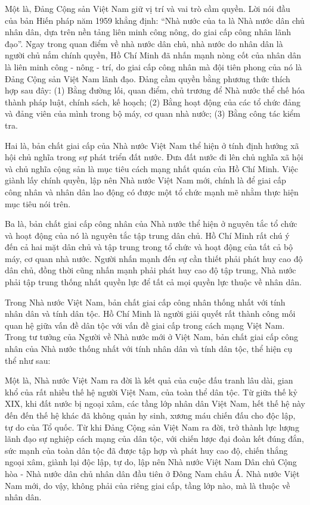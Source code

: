 Một là, Đảng Cộng sản Việt Nam giữ vị trí và vai trò cầm quyền. Lời nói đầu của bản Hiến pháp năm 1959 khẳng định: “Nhà nước của ta là Nhà nước dân chủ nhân dân, dựa trên nền tảng liên minh công nông, do giai cấp công nhân lãnh đạo”. Ngay trong quan điểm về nhà nước dân chủ, nhà nước do nhân dân là người chủ nắm chính quyền, Hồ Chí Minh đã nhấn mạnh nòng cốt của nhân dân là liên minh công - nông - trí, do giai cấp công nhân mà đội tiên phong của nó là Đảng Cộng sản Việt Nam lãnh đạo. Đảng cầm quyền bằng phương thức thích hợp sau đây: (1) Bằng đường lối, quan điểm, chủ trương để Nhà nước thể chế hóa thành pháp luật, chính sách, kế hoạch; (2) Bằng hoạt động của các tổ chức đảng và đảng viên của mình trong bộ máy, cơ quan nhà nước; (3) Bằng công tác kiểm tra.

Hai là, bản chất giai cấp của Nhà nước Việt Nam thể hiện ở tính định hướng xã hội chủ nghĩa trong sự phát triển đất nước. Đưa đất nước đi lên chủ nghĩa xã hội và chủ nghĩa cộng sản là mục tiêu cách mạng nhất quán của Hồ Chí Minh. Việc giành lấy chính quyền, lập nên Nhà nước Việt Nam mới, chính là để giai cấp công nhân và nhân dân lao động có được một tổ chức mạnh mẽ nhằm thực hiện mục tiêu nói trên.

Ba là, bản chất giai cấp công nhân của Nhà nước thể hiện ở nguyên tắc tổ chức và hoạt động của nó là nguyên tắc tập trung dân chủ. Hồ Chí Minh rất chú ý đến cả hai mặt dân chủ và tập trung trong tổ chức và hoạt động của tất cả bộ máy, cơ quan nhà nước. Người nhấn mạnh đến sự cần thiết phải phát huy cao độ dân chủ, đồng thời cũng nhấn mạnh phải phát huy cao độ tập trung, Nhà nước phải tập trung thống nhất quyền lực để tất cả mọi quyền lực thuộc về nhân dân.

Trong Nhà nước Việt Nam, bản chất giai cấp công nhân thống nhất với tính nhân dân và tính dân tộc. Hồ Chí Minh là người giải quyết rất thành công mối quan hệ giữa vấn đề dân tộc với vấn đề giai cấp trong cách mạng Việt Nam. Trong tư tưởng của Người về Nhà nước mới ở Việt Nam, bản chất giai cấp công nhân của Nhà nước thống nhất với tính nhân dân và tính dân tộc, thể hiện cụ thể như sau:

Một là, Nhà nước Việt Nam ra đời là kết quả của cuộc đấu tranh lâu dài, gian khổ của rất nhiều thế hệ người Việt Nam, của toàn thể dân tộc. Từ giữa thế kỷ XIX, khi đất nước bị ngoại xâm, các tầng lớp nhân dân Việt Nam, hết thế hệ này đến đến thế hệ khác đã không quản hy sinh, xương máu chiến đấu cho độc lập, tự do của Tổ quốc. Từ khi Đảng Cộng sản Việt Nam ra đời, trở thành lực lượng lãnh đạo sự nghiệp cách mạng của dân tộc, với chiến lược đại đoàn kết đúng đắn, sức mạnh của toàn dân tộc đã được tập hợp và phát huy cao độ, chiến thắng ngoại xâm, giành lại độc lập, tự do, lập nên Nhà nước Việt Nam Dân chủ Cộng hòa - Nhà nước dân chủ nhân dân đầu tiên ở Đông Nam châu Á. Nhà nước Việt Nam mới, do vậy, không phải của riêng giai cấp, tầng lớp nào, mà là thuộc về nhân dân.

